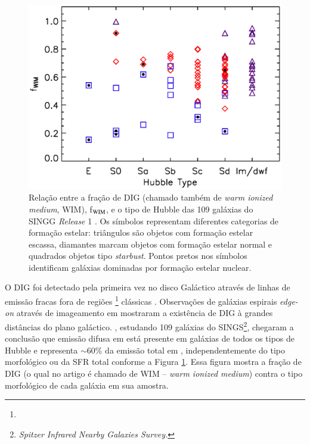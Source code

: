 \begin{figure}
	\centering
	\includegraphics[scale=0.7]{figuras/Oey_etal_2007_f8.eps}
	\caption[SINGG: f$_{\rm WIM} \times$ tipo de Hubble]
	{Relação entre a fração de DIG (chamado também de {\em warm ionized medium}, WIM), f$_{\rm WIM}$, e o tipo de Hubble das 109 galáxias do SINGG {\em Release} 1 \citep[SR1][]{Meurer.etal.2006}. Os símbolos representam diferentes categorias de formação estelar: triângulos são objetos com formação estelar escassa, diamantes marcam objetos com formação estelar normal e quadrados objetos tipo {\em starbust}. Pontos pretos nos símbolos identificam galáxias dominadas por formação estelar nuclear.}
	\label{fig:Oey_f8}
\end{figure}


O DIG foi detectado pela primeira vez no disco Galáctico através de linhas de emissão fracas fora de regiões \hii\footnote{}
clássicas \citep{Reynolds.PhD.1971}. Observações de galáxias espirais {\em edge-on} através de imageamento em \Ha \citep{Dettmar.1990, HoopesWaltGreen.1996, HoopesWaltRand.1999} mostraram a existência de DIG à grandes distâncias do plano galáctico. \cite{Oey.etal.2007}, estudando 109 galáxias do SINGS\footnote{\em Spitzer Infrared Nearby Galaxies Survey.}, chegaram a conclusão que emissão difusa em \Ha está presente em galáxias de todos os tipos de Hubble e representa $\sim60\%$ da emissão total em \Ha, independentemente do tipo morfológico ou da SFR total conforme a Figura \ref{fig:Oey_f8}. Essa figura mostra a fração de DIG (o qual no artigo é chamado de WIM -- {\em warm ionized medium}) contra o tipo morfológico de cada galáxia em sua amostra.

